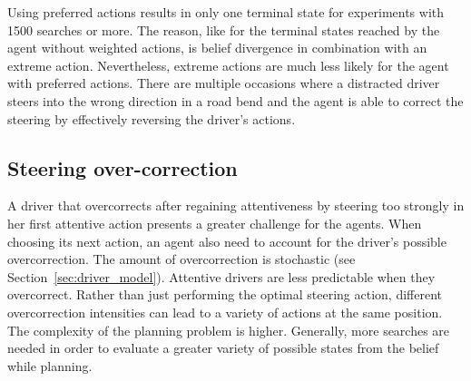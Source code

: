 Using preferred actions results in only one terminal state for experiments with 1500 searches or more. The reason, like for the terminal states reached by the agent without weighted actions, is belief divergence in combination with an extreme action. Nevertheless, extreme actions are much less likely for the agent with preferred actions. There are multiple occasions where a distracted driver steers into the wrong direction in a road bend and the agent is able to correct the steering by effectively reversing the driver's actions.




\subsection{Steering over-correction}



A driver that overcorrects after regaining attentiveness by steering too strongly in her first attentive action presents a greater challenge for the agents. When choosing its next action, an agent also need to account for the driver's possible overcorrection. The amount of overcorrection is stochastic (see Section~\ref{sec:driver_model}). Attentive drivers are less predictable when they overcorrect. Rather than just performing the optimal steering action, different overcorrection intensities can lead to a variety of actions at the same position. The complexity of the planning problem is higher. Generally, more searches are needed in order to evaluate a greater variety of possible states from the belief while planning.



